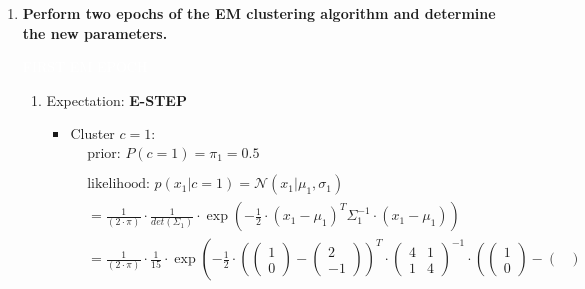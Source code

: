 \documentclass[12pt]{article}
\begin{document}
\begin{enumerate}
    \item \textbf{Perform two epochs of the EM clustering algorithm and determine the new parameters.}
    
    \vspace{10pt}
    \colorbox{codeblue}{\textcolor{white}{FIRST EM EPOCH}}

    \begin{enumerate}[label=\arabic*)]
        \item Expectation: \textbf{\textcolor{codeblue}{E-STEP}}
        
        \vspace{10pt}

        \vspace{10pt}
        \begin{itemize}[label=]
            \item Cluster $c=1$:
            \begin{equation*}
                \begin{aligned}
                    &\text{prior: } P(c=1) = \pi_1 = \mathbf{0.5} \\
                    \\
                    &\text{likelihood: } p(x_1|c=1) = \mathcal{N}(x_1| \mu_1, \sigma_1) \\
                    &= \frac{1}{(2 \cdot \pi)} \cdot \frac{1}{det(\Sigma_1)} \cdot \exp \left( -\frac{1}{2} \cdot (x_1 - \mu_1)^{T} \Sigma_1^{-1} \cdot (x_1 - \mu_1) \right)\\
                    &= \frac{1}{(2 \cdot \pi)} \cdot \frac{1}{15} \cdot \exp \left( -\frac{1}{2} \cdot \left(\begin{pmatrix}
                    1\\
                    0
                    \end{pmatrix} - \begin{pmatrix}
                    2\\
                    -1
                    \end{pmatrix}\right)^{T} \cdot \begin{pmatrix}
                    4 & 1\\
                    1 & 4
                    \end{pmatrix}^{-1} \cdot \left(\begin{pmatrix}
                    1\\
                    0
                    \end{pmatrix} - \begin{pmatrix}

\end{pmatrix}
\end{aligned}
\end{equation*}
\end{itemize}
\end{enumerate}
\end{enumerate}
\end{document}

